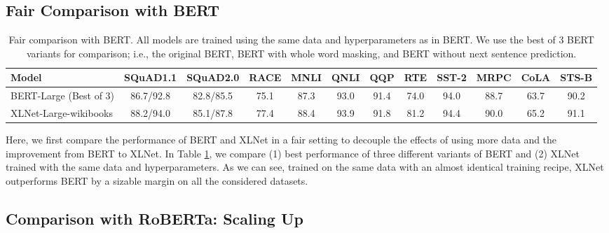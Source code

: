 \documentclass{article}
\begin{document}
\subsection{Fair Comparison with BERT} \label{sec:fair}
\begingroup
\setlength{\tabcolsep}{3pt}
\begin{table}[!h]
	\small
	\centering
	
	\begin{tabular}{p{1.8cm}|ccccccccccc}
		\toprule
		\bf Model & SQuAD1.1 & SQuAD2.0 & RACE & MNLI & QNLI & QQP & RTE & SST-2 & MRPC & CoLA & STS-B \\
		\midrule
		BERT-Large (Best of 3)  & 86.7/92.8 & 82.8/85.5 & 75.1 & 87.3 & 93.0 & 91.4 &  74.0 & 94.0 & 88.7 & 63.7 & 90.2 \\\midrule
		XLNet-Large-wikibooks & 88.2/94.0 & 85.1/87.8 & 77.4 & 88.4 & 93.9 & 91.8 & 81.2 & 94.4 & 90.0 & 65.2 & 91.1 \\
		\bottomrule
	\end{tabular}
	\caption{\small Fair comparison with BERT. All models are trained using the same data and hyperparameters as in BERT. We use the best of 3 BERT variants for comparison; i.e., the original BERT, BERT with whole word masking, and BERT without next sentence prediction.}
	\label{tab:fair}
\end{table}
\endgroup
Here, we first compare the performance of BERT and XLNet in a fair setting to decouple the effects of using more data and the improvement from BERT to XLNet. In Table \ref{tab:fair}, we compare (1) best performance of three different variants of BERT and (2) XLNet trained with the same data and hyperparameters.
As we can see, trained on the same data with an almost identical training recipe, XLNet outperforms BERT by a sizable margin on all the considered datasets.



\subsection{Comparison with RoBERTa: Scaling Up}
\label{sec:scale_up}
\end{document}
